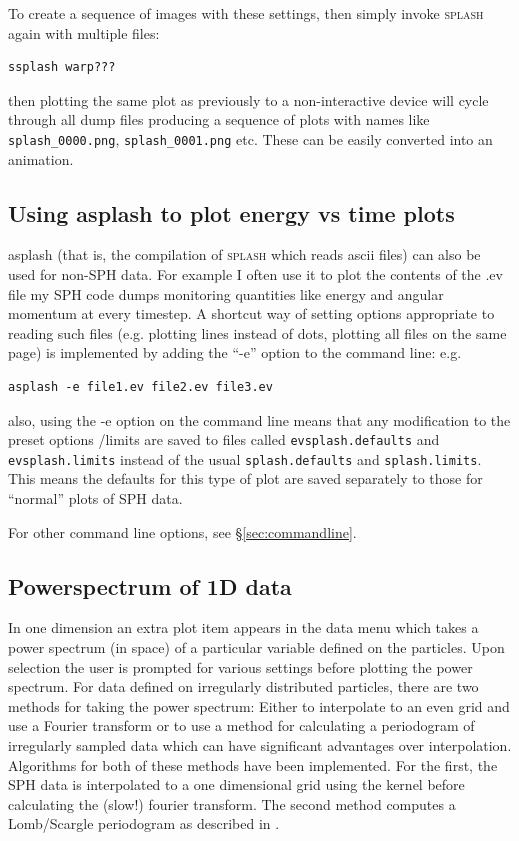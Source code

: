 \documentclass[a4paper,10pt]{article}
\newcommand{\splash}{\textsc{splash }}
\begin{document}
  To create a sequence of images with these settings, then simply invoke \splash again with multiple files:
\begin{verbatim}
ssplash warp???
\end{verbatim}
then plotting the same plot as previously to a non-interactive device will cycle through all dump files producing a sequence of plots with names like \verb+splash_0000.png+, \verb+splash_0001.png+ etc. These can be easily converted into an animation.

\subsection{Using asplash to plot energy vs time plots}
\label{sec:evsplash}
 asplash (that is, the compilation of \splash which reads ascii files) can also be used for non-SPH data. For example I often use it to plot the contents of the .ev file my SPH code dumps monitoring quantities like energy and angular momentum at every timestep. A shortcut way of setting options appropriate to reading such files (e.g. plotting lines instead of dots, plotting all files on the same page) is implemented by adding the ``-e'' option to the command line: e.g.
\begin{verbatim}
asplash -e file1.ev file2.ev file3.ev
\end{verbatim}
also, using the -e option on the command line means that any modification to the preset options /limits are saved to files called \verb+evsplash.defaults+ and \verb+evsplash.limits+ instead of the usual \verb+splash.defaults+ and \verb+splash.limits+. This means the defaults for this type of plot are saved separately to those for ``normal'' plots of SPH data.

  For other command line options, see \S\ref{sec:commandline}.

\subsection{Powerspectrum of 1D data}
 In one dimension an extra plot item appears
in the data menu which takes a power spectrum (in space) of a particular
variable defined on the particles. Upon selection the user is prompted for
various settings before plotting the power spectrum. For data defined on
irregularly distributed particles, there are two methods for taking the power
spectrum: Either to interpolate to an even grid and use a Fourier
transform or to use a method for calculating a periodogram of
irregularly sampled data which can have significant advantages over
interpolation. Algorithms for both of these methods have been
implemented. For the first, the SPH data is interpolated to a one dimensional
grid using the kernel before calculating the (slow!) fourier
transform. The second method computes a Lomb/Scargle periodogram as described in \citet{numericalrecipes}. 
\end{document}
